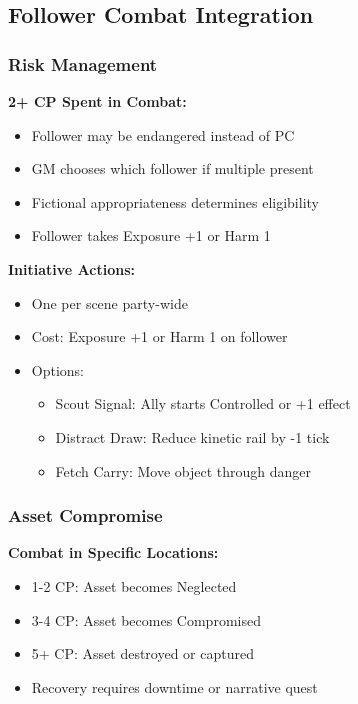 \subsection{Follower Combat Integration}

\subsubsection{Risk Management}
\textbf{2+ CP Spent in Combat:}
\begin{itemize}[leftmargin=*]
    \item Follower may be endangered instead of PC
    \item GM chooses which follower if multiple present
    \item Fictional appropriateness determines eligibility
    \item Follower takes Exposure +1 or Harm 1
\end{itemize}

\textbf{Initiative Actions:}
\begin{itemize}[leftmargin=*]
    \item One per scene party-wide
    \item Cost: Exposure +1 or Harm 1 on follower
    \item Options:
    \begin{itemize}
        \item Scout Signal: Ally starts Controlled or +1 effect
        \item Distract Draw: Reduce kinetic rail by -1 tick
        \item Fetch Carry: Move object through danger
    \end{itemize}
\end{itemize}

\subsubsection{Asset Compromise}
\textbf{Combat in Specific Locations:}
\begin{itemize}[leftmargin=*]
    \item 1-2 CP: Asset becomes Neglected
    \item 3-4 CP: Asset becomes Compromised
    \item 5+ CP: Asset destroyed or captured
    \item Recovery requires downtime or narrative quest
\end{itemize}

